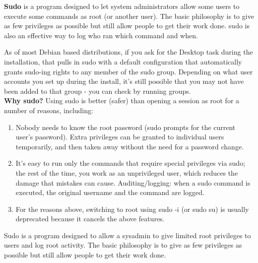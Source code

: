 \documentclass[a4paper,11pt,spanish]{article} %
\begin{document}
\textbf{Sudo} is a program designed to let system administrators allow some users to execute some commands
as root (or another user). The basic philosophy is to give as few privileges as possible but still
allow people to get their work done. \ac{sudo} is also an effective way to log who ran which command and when.

As of most Debian based distributions, if you ask for the Desktop task during the installation, that pulls in \ac{sudo} with
a default configuration that automatically grants sudo-ing rights to any member of the \ac{sudo} group.
Depending on what user accounts you set up during the install, it's still possible that you may not
have been added to that group - you can check by running groups.\\

\textbf{Why \ac{sudo}?}
Using sudo is better (safer) than opening a session as root for a number of reasons, including:
\begin{enumerate}
 \item Nobody needs to know the root password (\ac{sudo} prompts for the current user's password). 
 Extra privileges can be granted to individual users temporarily, and then taken away without the 
 need for a password change.
 
 \item It's easy to run only the commands that require special privileges via \ac{sudo}; the rest of the time,
you work as an unprivileged user, which reduces the damage that mistakes can cause.
Auditing/logging: when a \ac{sudo} command is executed, the original username and the command are logged.
 
 \item For the reasons above, switching to root using \ac{sudo} -i (or sudo su) is usually deprecated because
it cancels the above features.

\end{enumerate}

Sudo is a program designed to allow a sysadmin to give limited root privileges to users and log root
activity. The basic philosophy is to give as few privileges as possible but still allow people to get
their work done.\\

\cite{debiansudo}
\end{document}
